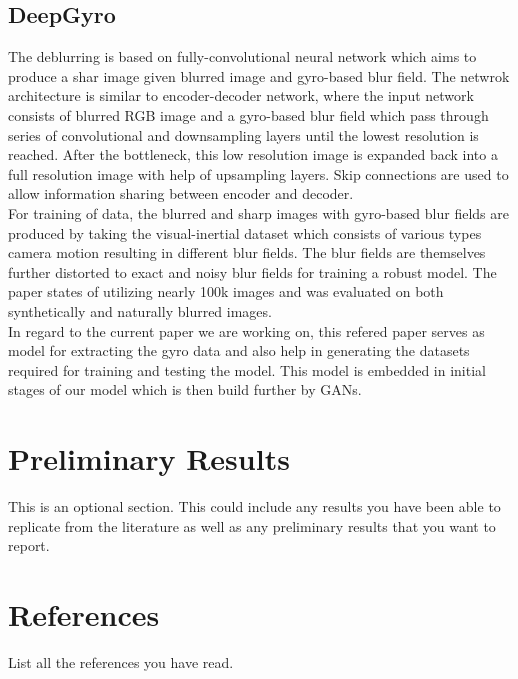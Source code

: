 \documentclass[10pt,twocolumn,letterpaper]{article}
\begin{document}
\subsection{DeepGyro}
The deblurring is based on fully-convolutional neural network which aims to produce a shar image given blurred image and gyro-based blur field. The netwrok architecture is similar to encoder-decoder network, where the input network consists of blurred RGB image and a gyro-based blur field which pass through series of convolutional and downsampling layers until the lowest resolution is reached. After the bottleneck, this low resolution image is expanded back into a full resolution image with help of upsampling layers. Skip connections are used to allow information sharing between encoder and decoder.\\
For training of data, the blurred and sharp images with gyro-based blur fields are produced by taking the visual-inertial dataset which consists of various types camera motion resulting in different blur fields. The blur fields are themselves further distorted to exact and noisy blur fields for training a robust model. The paper states of utilizing nearly 100k images and was evaluated on both synthetically and naturally blurred images.
\\

In regard to the current paper we are working on, this refered paper serves as model for extracting the gyro data and also  help in generating the datasets required for training and testing the model. This model is embedded in initial stages of our model which is then build further by GANs.
\section{Preliminary Results}
\label{sec:prelim_results}
This is an optional section. This could include any results you have been able to replicate from the literature as well as any preliminary results that you want to report.

\section{References}
List all the references you have read.

{\small


}
\end{document}
